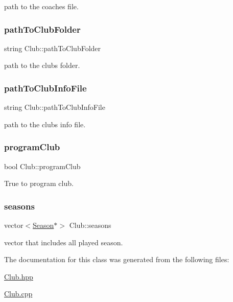 path to the coaches\textquotesingle{} file. 

\hypertarget{class_club_a7c15547fa5dac447cd5a986ae3b4f7c3}{}\label{class_club_a7c15547fa5dac447cd5a986ae3b4f7c3} 
\subsubsection{\texorpdfstring{path\+To\+Club\+Folder}{pathToClubFolder}}
{\footnotesize\ttfamily string Club\+::path\+To\+Club\+Folder\hspace{0.3cm}{\ttfamily [private]}}



path to the club\textquotesingle{}s folder. 

\hypertarget{class_club_a01f1d1dc26bca7dda9ceea7521d294eb}{}\label{class_club_a01f1d1dc26bca7dda9ceea7521d294eb} 
\subsubsection{\texorpdfstring{path\+To\+Club\+Info\+File}{pathToClubInfoFile}}
{\footnotesize\ttfamily string Club\+::path\+To\+Club\+Info\+File\hspace{0.3cm}{\ttfamily [private]}}



path to the club\textquotesingle{}s info file. 

\hypertarget{class_club_aff52eace9c0bf641cc73a55b5c062bc4}{}\label{class_club_aff52eace9c0bf641cc73a55b5c062bc4} 
\subsubsection{\texorpdfstring{program\+Club}{programClub}}
{\footnotesize\ttfamily bool Club\+::program\+Club\hspace{0.3cm}{\ttfamily [private]}}



True to program club. 

\hypertarget{class_club_af94fabc0c00f49220bd959b0ec2bda26}{}\label{class_club_af94fabc0c00f49220bd959b0ec2bda26} 
\subsubsection{\texorpdfstring{seasons}{seasons}}
{\footnotesize\ttfamily vector$<$\hyperlink{class_season}{Season}$\ast$$>$ Club\+::seasons\hspace{0.3cm}{\ttfamily [private]}}



vector that includes all played season. 



The documentation for this class was generated from the following files\+:\begin{DoxyCompactItemize}
\item 
\hyperlink{_club_8hpp}{Club.\+hpp}\item 
\hyperlink{_club_8cpp}{Club.\+cpp}\end{DoxyCompactItemize}
